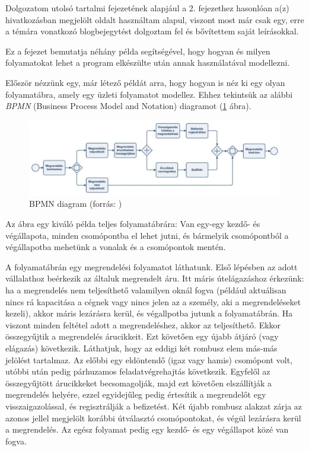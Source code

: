 

Dolgozatom utolsó tartalmi fejezetének alapjául a 2. fejezethez hasonlóan a(z) \cite{xflower} hivatkozásban megjelölt oldalt használtam alapul, viszont most már csak egy, erre a témára vonatkozó blogbejegytést\cite{xflowutolso} dolgoztam fel és bővítettem saját leírásokkal.


Ez a fejezet bemutatja néhány példa segítségével, hogy hogyan és milyen folyamatokat lehet a program elkészülte után annak használatával modellezni.


Először nézzünk egy, már létező példát arra, hogy hogyan is néz ki egy olyan folyamatábra, amely egy üzleti folyamatot modellez. Ehhez tekintsük az alábbi \textit{BPMN} (Business Process Model and Notation) diagramot (\ref{fig:bpmn} ábra).

\begin{figure}[h]
\centering
\includegraphics[scale=0.38]{images/BPMN.png}
\caption{BPMN diagram (forrás: \cite{bpmn})}
\label{fig:bpmn}
\end{figure}

Az ábra egy kiváló példa teljes folyamatábrára: Van egy-egy kezdő- és végállapota, minden csomópontba el lehet jutni, és bármelyik csomópontból a végállapotba mehetünk a vonalak és a csomópontok mentén.

A folyamatábrán egy megrendelési folyamatot láthatunk. Első lépésben az adott vállalathoz beérkezik az általuk megrendelt áru. Itt máris útelágazáshoz érkezünk: ha a megrendelés nem teljesíthető valamilyen oknál fogva (például aktuálisan nincs rá kapacitása a cégnek vagy nincs jelen az a személy, aki a megrendeléseket kezeli), akkor máris lezárásra kerül, és végallpotba jutunk a folyamatábrán. Ha viszont minden feltétel adott a megrendeléshez, akkor az teljesíthető. Ekkor összegyűjtik a megrendelés árucikkeit. Ezt követően egy újabb átjáró (vagy elágazás) következik. Láthatjuk, hogy az eddigi két rombusz elem más-más jelölést tartalmaz. Az előbbi egy eldöntendő (igaz vagy hamis) csomópont volt, utóbbi után pedig párhuzamos feladatvégrehajtás következik. Egyfelől az összegyűjtött árucikkeket becsomagolják, majd ezt követően elszállítják a megrendelés helyére, ezzel egyidejűleg pedig értesítik a megrendelőt egy visszaigazolással, és regisztrálják a befizetést. Két újabb rombusz alakzat zárja az azonos jellel megjelölt korábbi útválasztó csomópontokat, és végül lezárásra kerül a megrendelés. Az egész folyamat pedig egy kezdő- és egy végállapot közé van fogva.

